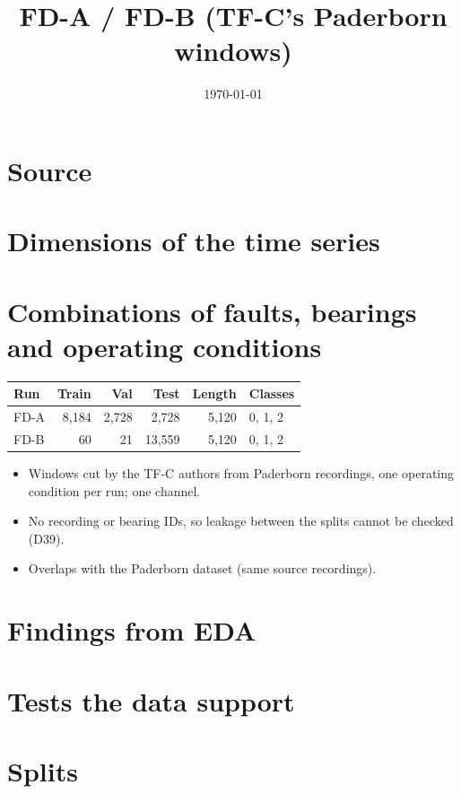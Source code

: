 \documentclass[11pt,a4paper]{article}
\title{FD-A / FD-B (TF-C's Paderborn windows)}
\author{}
\date{\today}
\begin{document}
\maketitle

\section{Source}

\section{Dimensions of the time series}

\section{Combinations of faults, bearings and operating conditions}

\begin{table}[h]
\centering
\small
\begin{tabular}{lrrrrl}
\toprule
Run & Train & Val & Test & Length & Classes \\
\midrule
FD-A & 8,184 & 2,728 & 2,728  & 5,120 & 0, 1, 2 \\
FD-B & 60    & 21    & 13,559 & 5,120 & 0, 1, 2 \\
\bottomrule
\end{tabular}
\end{table}

\begin{itemize}
  \item Windows cut by the TF-C authors from Paderborn recordings, one operating condition
        per run; one channel.
  \item No recording or bearing IDs, so leakage between the splits cannot be checked (D39).
  \item Overlaps with the Paderborn dataset (same source recordings).
\end{itemize}

\section{Findings from EDA}

\section{Tests the data support}

\section{Splits}
\end{document}

